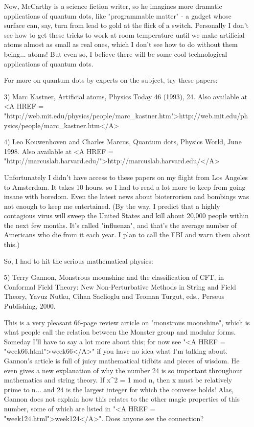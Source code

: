 Now, McCarthy is a science fiction writer, so he imagines more dramatic
applications of quantum dots, like "programmable matter" - a gadget
whose surface can, say, turn from lead to gold at the flick of a switch.
Personally I don't see how to get these tricks to work at room
temperature until we make artificial atoms almost as small as real ones,
which I don't see how to do without them being... atoms!  But even
so, I believe there will be some cool technological applications of quantum
dots.

For more on quantum dots by experts on the subject, try these papers:

3) Marc Kastner, Artificial atoms, Physics Today 46 (1993), 24.  Also
available at <A HREF = "http://web.mit.edu/physics/people/marc_kastner.htm">http://web.mit.edu/physics/people/marc_kastner.htm</A>


4) Leo Kouwenhoven and Charles Marcus, Quantum dots, Physics World, June 
1998.  Also available at <A HREF = "http://marcuslab.harvard.edu/">http://marcuslab.harvard.edu/</A>

Unfortunately I didn't have access to these papers on my flight from Los
Angeles to Amsterdam.  It takes 10 hours, so I had to read a lot more to
keep from going insane with boredom.  Even the latest news about bioterrorism
and bombings was not enough to keep me entertained.  (By the way, I predict 
that a highly contagious virus will sweep the United States and kill
about 20,000 people within the next few months.  It's 
called "influenza", 
and that's the average number of Americans who die from it each year.
I plan to call the FBI and warn them about this.)

So, I had to hit the serious mathematical physics:

5) Terry Gannon, Monstrous moonshine and the classification of CFT,
in Conformal Field Theory: New Non-Perturbative Methods in String and
Field Theory, Yavuz Nutku, Cihan Saclioglu and Teoman Turgut, eds., 
Perseus Publishing, 2000.

This is a very pleasant 66-page review article on "monstrous
moonshine", which is what people call the relation between the
Monster group and modular forms.  Someday I'll have to say a lot more
about this; for now see "<A HREF = "week66.html">week66</A>"
if you have no idea what I'm talking about.  Gannon's article is full of
juicy mathematical tidbits and pieces of wisdom.  He even gives a new
explanation of why the number 24 is so important throughout mathematics
and string theory.  If x^{2} = 1 mod n, then x must be
relatively prime to n... and 24 is the largest integer for which the
converse holds!  Alas, Gannon does not explain how this relates to the
other magic properties of this number, some of which are listed in
"<A HREF = "week124.html">week124</A>".  Does anyone see the
connection?

